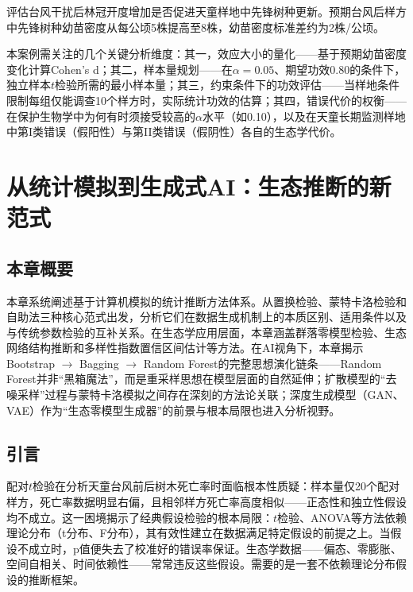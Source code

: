 \documentclass[
  twoside,12pt,fontset=none]{ctexbook}
\begin{document}
评估台风干扰后林冠开度增加是否促进天童样地中先锋树种更新。预期台风后样方中先锋树种幼苗密度从每公顷5株提高至8株，幼苗密度标准差约为2株/公顷。

本案例需关注的几个关键分析维度：其一，效应大小的量化------基于预期幼苗密度变化计算Cohen's d；其二，样本量规划------在\(\alpha=0.05\)、期望功效0.80的条件下，独立样本\(t\)检验所需的最小样本量；其三，约束条件下的功效评估------当样地条件限制每组仅能调查10个样方时，实际统计功效的估算；其四，错误代价的权衡------在保护生物学中为何有时须接受较高的\(\alpha\)水平（如0.10），以及在天童长期监测样地中第I类错误（假阳性）与第II类错误（假阴性）各自的生态学代价。

\hypertarget{ch07}{%
\chapter{从统计模拟到生成式AI：生态推断的新范式}\label{ch07}}

\hypertarget{ux672cux7ae0ux6982ux8981-5}{%
\section{本章概要}\label{ux672cux7ae0ux6982ux8981-5}}

本章系统阐述基于计算机模拟的统计推断方法体系。从置换检验、蒙特卡洛检验和自助法三种核心范式出发，分析它们在数据生成机制上的本质区别、适用条件以及与传统参数检验的互补关系。在生态学应用层面，本章涵盖群落零模型检验、生态网络结构推断和多样性指数置信区间估计等方法。在AI视角下，本章揭示Bootstrap \(\to\) Bagging \(\to\) Random Forest的完整思想演化链条------Random Forest并非``黑箱魔法''，而是重采样思想在模型层面的自然延伸；扩散模型的``去噪采样''过程与蒙特卡洛模拟之间存在深刻的方法论关联；深度生成模型（GAN、VAE）作为``生态零模型生成器''的前景与根本局限也进入分析视野。

\hypertarget{ux5f15ux8a00-5}{%
\section{引言}\label{ux5f15ux8a00-5}}

配对\(t\)检验在分析天童台风前后树木死亡率时面临根本性质疑：样本量仅20个配对样方，死亡率数据明显右偏，且相邻样方死亡率高度相似------正态性和独立性假设均不成立。这一困境揭示了经典假设检验的根本局限：\(t\)检验、ANOVA等方法依赖理论分布（t分布、F分布），其有效性建立在数据满足特定假设的前提之上。当假设不成立时，p值便失去了校准好的错误率保证。生态学数据------偏态、零膨胀、空间自相关、时间依赖性------常常违反这些假设。需要的是一套不依赖理论分布假设的推断框架。
\end{document}
